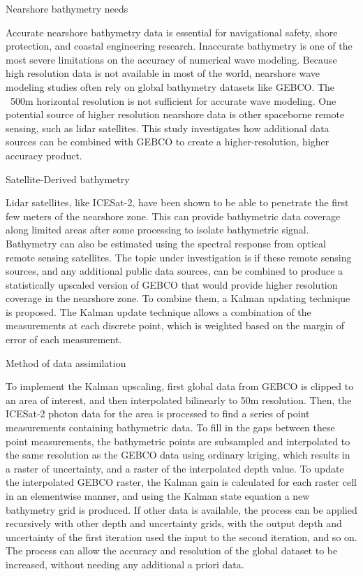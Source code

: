 Nearshore bathymetry needs 

Accurate nearshore bathymetry data is essential for navigational safety, shore protection, and coastal engineering research. Inaccurate bathymetry is one of the most severe limitations on the accuracy of numerical wave modeling. Because high resolution data is not available in most of the world, nearshore wave modeling studies often rely on global bathymetry datasets like GEBCO. The ~500m horizontal resolution is not sufficient for accurate wave modeling. One potential source of higher resolution nearshore data is other spaceborne remote sensing, such as lidar satellites. This study investigates how additional data sources can be combined with GEBCO to create a higher-resolution, higher accuracy product.

Satellite-Derived bathymetry

Lidar satellites, like ICESat-2, have been shown to be able to penetrate the first few meters of the nearshore zone. This can provide bathymetric data coverage along limited areas after some processing to isolate bathymetric signal. Bathymetry can also be estimated using the spectral response from optical remote sensing satellites. The topic under investigation is if these remote sensing sources, and any additional public data sources, can be combined to produce a statistically upscaled version of GEBCO that would provide higher resolution coverage in the nearshore zone. To combine them, a Kalman updating technique is proposed. The Kalman update technique allows a combination of the measurements at each discrete point, which is weighted based on the margin of error of each measurement.

Method of data assimilation 

To implement the Kalman upscaling, first global data from GEBCO is clipped to an area of interest, and then interpolated bilinearly to 50m resolution. Then, the ICESat-2 photon data for the area is processed to find a series of point measurements containing bathymetric data. To fill in the gaps between these point measurements, the bathymetric points are subsampled and interpolated to the same resolution as the GEBCO data using ordinary kriging, which results in a raster of uncertainty, and a raster of the interpolated depth value. To update the interpolated GEBCO raster, the Kalman gain is calculated for each raster cell in an elementwise manner, and using the Kalman state equation a new bathymetry grid is produced. If other data is available, the process can be applied recursively with other depth and uncertainty grids, with the output depth and uncertainty of the first iteration used the input to the second iteration, and so on. The process can allow the accuracy and resolution of the global dataset to be increased, without needing any additional a priori data.

